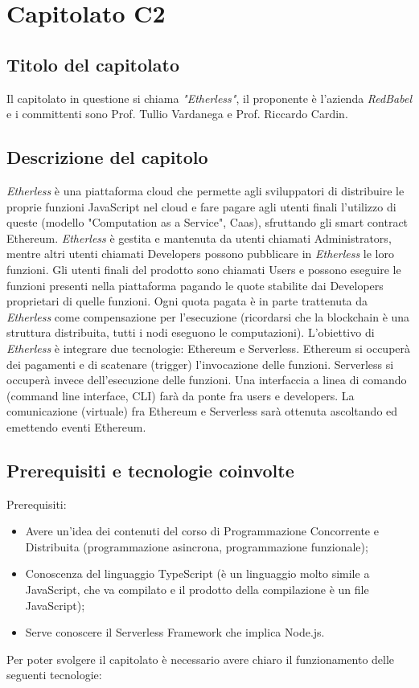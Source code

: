 \section{Capitolato C2}
\subsection{Titolo del capitolato}
Il capitolato in questione si chiama \textit{"Etherless"}, il proponente è l'azienda \textit{RedBabel} e i committenti sono Prof. Tullio Vardanega e Prof. Riccardo Cardin.

\subsection{Descrizione del capitolo}
\textit{Etherless} è una piattaforma cloud che permette agli sviluppatori di distribuire le proprie funzioni JavaScript nel cloud e fare pagare agli utenti finali l'utilizzo di queste (modello "Computation as a Service", Caas), sfruttando gli smart contract Ethereum. 
\textit{Etherless} è gestita e mantenuta da utenti chiamati Administrators, mentre altri utenti chiamati Developers possono pubblicare in \textit{Etherless} le loro funzioni. Gli utenti finali del prodotto sono chiamati Users e possono eseguire le funzioni presenti nella piattaforma pagando le quote stabilite dai Developers proprietari di quelle funzioni. Ogni quota pagata è in parte trattenuta da \textit{Etherless} come compensazione per l'esecuzione (ricordarsi che la blockchain è una struttura distribuita, tutti i nodi eseguono le computazioni).
L'obiettivo di \textit{Etherless} è integrare due tecnologie: Ethereum e Serverless. Ethereum si occuperà dei pagamenti e di scatenare (trigger) l'invocazione delle funzioni. Serverless si occuperà invece dell'esecuzione delle funzioni. Una interfaccia a linea di comando (command line interface, CLI) farà da ponte fra users e developers. La comunicazione (virtuale) fra Ethereum e Serverless sar\`a ottenuta ascoltando ed emettendo eventi Ethereum.

\subsection{Prerequisiti e tecnologie coinvolte}
Prerequisiti:
\begin{itemize}
\item Avere un'idea dei contenuti del corso di Programmazione Concorrente e Distribuita (programmazione asincrona, programmazione funzionale);
\item Conoscenza del linguaggio TypeScript (\`e un linguaggio molto simile a JavaScript, che va compilato e il prodotto della compilazione \`e un file JavaScript);
\item Serve conoscere il Serverless Framework che implica Node.js.
\end{itemize}
Per poter svolgere il capitolato \`e necessario avere chiaro il funzionamento delle seguenti tecnologie:

